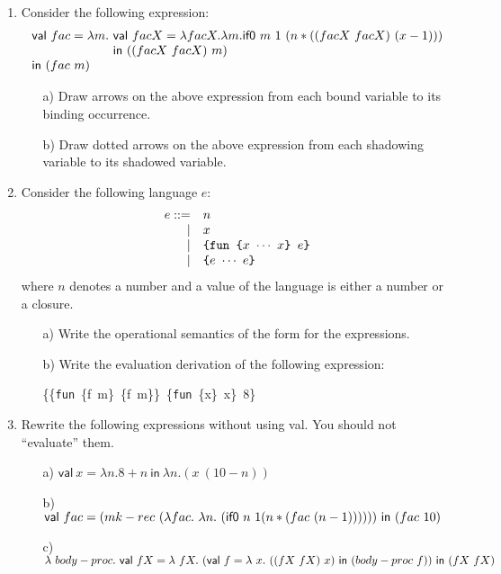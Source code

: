 \begin{enumerate}
\item Consider the following expression:
\[
\begin{array}{l@{~}l}
\textsf{val}\ \term{fac} = \lambda m. &
\textsf{val}\ \term{facX} = \lambda \term{facX}.
\lambda m. \textsf{if0}\ m\ 1\ (n * ((\term{facX}\ \term{facX})\ (x - 1)))\\
&\textsf{in}\ ((\term{facX}\ \term{facX})\ m)\\
\textsf{in}\ (\term{fac}\ m)
\end{array}
\]

\begin{itemize}
\item[a)] Draw arrows on the above expression from each bound variable to its binding occurrence.
\item[b)] Draw dotted arrows on the above expression from each shadowing variable to its shadowed variable.
\end{itemize}

\item Consider the following language $e$:
\[
\begin{array}{rll}
e ::= & n\\
\mid& x\\
\mid& \verb!{fun {! x\ \cdots\ x\verb+} +e\verb+}+\\
\mid& \verb!{! e\ \cdots\ e\verb+}+\\
\end{array}
\]
where $n$ denotes a number and a value of the language is either a number or a closure.
\begin{itemize}
  \item[a)] Write the operational semantics of the form  for the expressions.
  \item[b)] Write the evaluation derivation of the following expression:

\derive
{\hspace*{\textwidth}}
{\emptyset\vdash \{\{\texttt{fun}\ \{f\ m\}\ \{f\ m\}\}\
\{\texttt{fun}\ \{x\}\ x\}\ 8\} \Rightarrow~~~~~~~~}
\end{itemize}

\item Rewrite the following expressions without using \textsf{val}.
You should not ``evaluate'' them.

\begin{itemize}
\item[a)] \(\textsf{val}\ x = \lambda n. 8 + n\ \textsf{in}\ \lambda n. (x\ (10 - n))\)
\item[b)] \(\textsf{val}\ fac = (mk-rec\ (\lambda fac.\ \lambda n.\ (\textsf{if0}\ n\ 1 (n * (fac\ (n - 1))))))\ \textsf{in}\ (fac\ 10)\)
\item[c)] \(\lambda\ body-proc.\
\textsf{val}\ fX = \lambda\ fX.\
(\textsf{val}\ f = \lambda\ x.\ ((fX\ fX)\ x)\
\textsf{in}\ (body-proc\ f))\
\textsf{in}\ (fX\ fX) \)
\end{itemize}


\end{enumerate}
